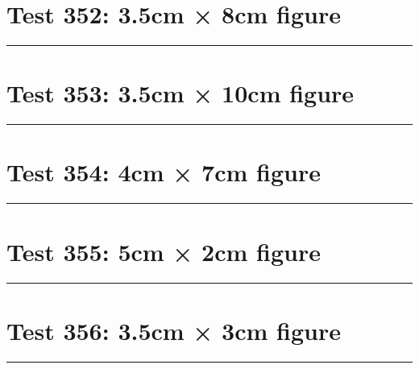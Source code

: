 \documentclass[a4paper,11pt]{article}
\begin{document}
\section*{Test 352: 3.5cm × 8cm figure}
\begin{swarmwrap}%
  \begin{minipage}[t]{3cm}
    \centering
    \rule{\linewidth}{8cm}
  \end{minipage}%
\end{swarmwrap}%
\swarmwrapnext
\lipsum[35]
\lipsum[36]
\lipsum[37]
\lipsum[38]
\section*{Test 353: 3.5cm × 10cm figure}
\begin{swarmwrap}%
  \begin{minipage}[t]{3cm}
    \centering
    \rule{\linewidth}{10cm}
  \end{minipage}%
\end{swarmwrap}%
\swarmwrapnext
\lipsum[130]
\lipsum[131]
\lipsum[132]
\lipsum[133]
\section*{Test 354: 4cm × 7cm figure}
\begin{swarmwrap}%
  \begin{minipage}[t]{4cm}
    \centering
    \rule{\linewidth}{7cm}
  \end{minipage}%
\end{swarmwrap}%
\swarmwrapnext
\lipsum[103]
\lipsum[104]
\lipsum[105]
\section*{Test 355: 5cm × 2cm figure}
\begin{swarmwrap}%
  \begin{minipage}[t]{5cm}
    \centering
    \rule{\linewidth}{2cm}
  \end{minipage}%
\end{swarmwrap}%
\swarmwrapnext
\lipsum[6]
\lipsum[7]
\lipsum[8]
\lipsum[9]
\lipsum[10]
\lipsum[11]
\section*{Test 356: 3.5cm × 3cm figure}
\begin{swarmwrap}%
  \begin{minipage}[t]{3cm}
    \centering
    \rule{\linewidth}{3cm}
  \end{minipage}%
\end{swarmwrap}%
\swarmwrapnext
\lipsum[149]
\lipsum[150]
\lipsum[1]
\lipsum[2]
\lipsum[3]
\end{document}
